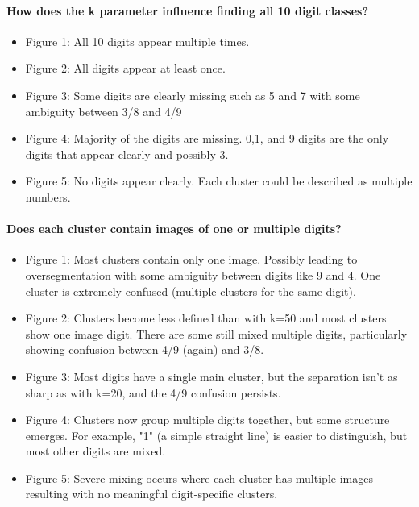 \documentclass{article}
\begin{document}
\paragraph{How does the k parameter influence finding all
10 digit classes?}
\begin{itemize}
    \item Figure 1: All 10 digits appear multiple times.
    \item Figure 2: All digits appear at least once.
    \item Figure 3: Some digits are clearly missing such as 5 and 7 with some ambiguity between 3/8 and 4/9
    \item Figure 4: Majority of the digits are missing. 0,1, and 9 digits are the only digits that appear clearly and possibly 3.
    \item Figure 5: No digits appear clearly. Each cluster could be described as multiple numbers.
\end{itemize}

\paragraph{Does each cluster contain images of one or multiple digits?}
\begin{itemize}
    \item Figure 1: Most clusters contain only one image. Possibly leading to oversegmentation with some ambiguity between digits like 9 and 4. One cluster is extremely confused (multiple clusters for the same digit).
    \item Figure 2: Clusters become less defined than with k=50 and most clusters show one image digit. There are some still mixed multiple digits, particularly showing confusion between 4/9 (again) and 3/8.
    \item Figure 3: Most digits have a single main cluster, but the separation isn't as sharp as with k=20, and the 4/9 confusion persists.
    \item Figure 4: Clusters now group multiple digits together, but some structure emerges. For example, "1" (a simple straight line) is easier to distinguish, but most other digits are mixed.
    \item Figure 5: Severe mixing occurs where each cluster has multiple images resulting with no meaningful digit-specific clusters.
\end{itemize}
\end{document}
